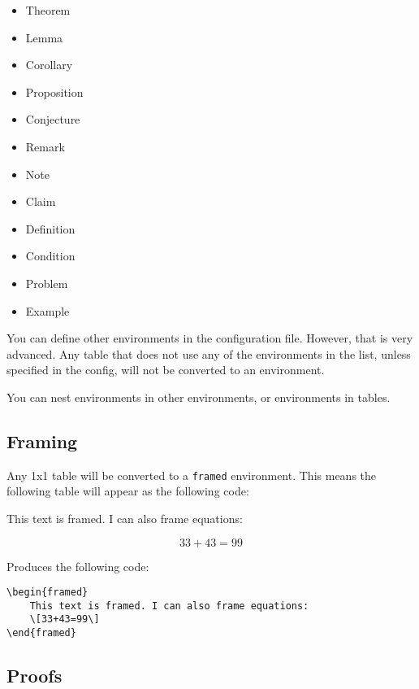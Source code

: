 \documentclass[
]{article}
\theoremstyle{plain}
\theoremstyle{remark}
\theoremstyle{definition}
\begin{document}
\begin{itemize}
\item
  Theorem
\item
  Lemma
\item
  Corollary
\item
  Proposition
\item
  Conjecture
\item
  Remark
\item
  Note
\item
  Claim
\item
  Definition
\item
  Condition
\item
  Problem
\item
  Example
\end{itemize}

You can define other environments in the configuration file. However,
that is very advanced. Any table that does not use any of the
environments in the list, unless specified in the config, will not be
converted to an environment.

You can nest environments in other environments, or environments in
tables.


\subsection{Framing}

Any 1x1 table will be converted to a \texttt{framed} environment. This
means the following table will appear as the following code:

\begin{framed}

This text is framed. I can also frame equations:

\[33 + 43 = 99\]

\end{framed}



Produces the following code:

\begin{verbatim}
\begin{framed}
    This text is framed. I can also frame equations:
    \[33+43=99\]
\end{framed}
\end{verbatim}


\subsection{Proofs}
\end{document}
